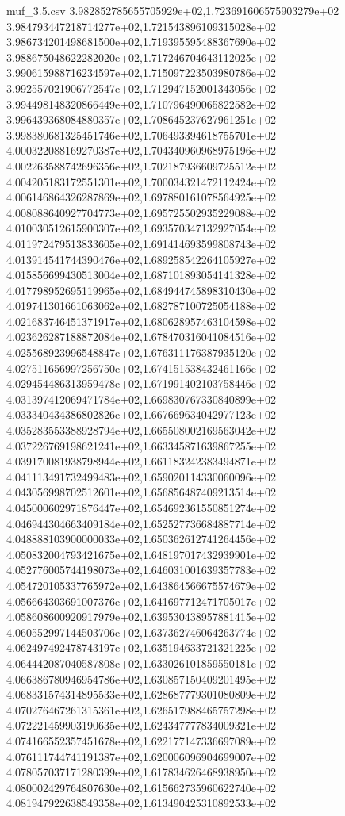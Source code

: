 \begin{filecontents*}{muf_3.5.csv}
3.982852785655705929e+02,1.723691606575903279e+02
3.984793447218714277e+02,1.721543896109315028e+02
3.986734201498681500e+02,1.719395595488367690e+02
3.988675048622282020e+02,1.717246704643112025e+02
3.990615988716234597e+02,1.715097223503980786e+02
3.992557021906772547e+02,1.712947152001343056e+02
3.994498148320866449e+02,1.710796490065822582e+02
3.996439368084880357e+02,1.708645237627961251e+02
3.998380681325451746e+02,1.706493394618755701e+02
4.000322088169270387e+02,1.704340960968975196e+02
4.002263588742696356e+02,1.702187936609725512e+02
4.004205183172551301e+02,1.700034321472112424e+02
4.006146864326287869e+02,1.697880161078564925e+02
4.008088640927704773e+02,1.695725502935229088e+02
4.010030512615900307e+02,1.693570347132927054e+02
4.011972479513833605e+02,1.691414693599808743e+02
4.013914541744390476e+02,1.689258542264105927e+02
4.015856699430513004e+02,1.687101893054141328e+02
4.017798952695119965e+02,1.684944745898310430e+02
4.019741301661063062e+02,1.682787100725054188e+02
4.021683746451371917e+02,1.680628957463104598e+02
4.023626287188872084e+02,1.678470316041084516e+02
4.025568923996548847e+02,1.676311176387935120e+02
4.027511656997256750e+02,1.674151538432461166e+02
4.029454486313959478e+02,1.671991402103758446e+02
4.031397412069471784e+02,1.669830767330840899e+02
4.033340434386802826e+02,1.667669634042977123e+02
4.035283553388928794e+02,1.665508002169563042e+02
4.037226769198621241e+02,1.663345871639867255e+02
4.039170081938798944e+02,1.661183242383494871e+02
4.041113491732499483e+02,1.659020114330060096e+02
4.043056998702512601e+02,1.656856487409213514e+02
4.045000602971876447e+02,1.654692361550851274e+02
4.046944304663409184e+02,1.652527736684887714e+02
4.048888103900000033e+02,1.650362612741264456e+02
4.050832004793421675e+02,1.648197017432939901e+02
4.052776005744198073e+02,1.646031001639357783e+02
4.054720105337765972e+02,1.643864566675574679e+02
4.056664303691007376e+02,1.641697712471705017e+02
4.058608600920917979e+02,1.639530438957881415e+02
4.060552997144503706e+02,1.637362746064263774e+02
4.062497492478743197e+02,1.635194633721321225e+02
4.064442087040587808e+02,1.633026101859550181e+02
4.066386780946954786e+02,1.630857150409201495e+02
4.068331574314895533e+02,1.628687779301080809e+02
4.070276467261315361e+02,1.626517988465757298e+02
4.072221459903190635e+02,1.624347777834009321e+02
4.074166552357451678e+02,1.622177147336697089e+02
4.076111744741191387e+02,1.620006096904699007e+02
4.078057037171280399e+02,1.617834626468938950e+02
4.080002429764807630e+02,1.615662735960622740e+02
4.081947922638549358e+02,1.613490425310892533e+02

\end{filecontents*}
